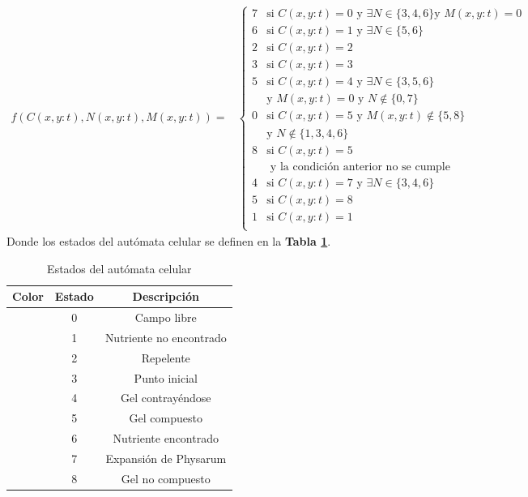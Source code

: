    \begin{equation*}
    \begin{aligned}
    f(C(x,y:t), N(x,y:t), M(x,y:t)) = & \begin{cases}
        7 & \text{si } C(x,y:t) = 0 \text{ y } \exists N \in \{3, 4, 6\} \text{y } M(x,y:t) = 0 \\
        6 & \text{si } C(x,y:t) = 1 \text{ y } \exists N \in \{5, 6\} \\
        2 & \text{si } C(x,y:t) = 2 \\
        3 & \text{si } C(x,y:t) = 3 \\
        5 & \text{si } C(x,y:t) = 4 \text{ y } \exists N \in \{3, 5, 6\} \\
        & \text{y } M(x,y:t) = 0 \text{ y } N \not\in \{0, 7\} \\
        0 & \text{si } C(x,y:t) = 5 \text{ y } M(x,y:t) \not\in \{5, 8\} \\
        & \text{y } N \not\in \{1, 3, 4, 6\} \\
        8 & \text{si } C(x,y:t) = 5 \\
        & \text{ y la condici\'on anterior no se cumple} \\
        4 & \text{si } C(x,y:t) = 7 \text{ y } \exists N \in \{3, 4, 6\} \\
        5 & \text{si } C(x,y:t) = 8 \\
        1 & \text{si } C(x,y:t) = 1 \\
    \end{cases}
    \end{aligned}
    \end{equation*}
    Donde los estados del aut\'omata celular se definen en la \textbf{Tabla \ref{tab:estados}}.
    \vskip 0.5cm
    \begin{table}[h]
        \begin{center}
            \begin{tabular}{|c|c|c|}
                \hline
                \textbf{Color}&\textbf{Estado}&\textbf{Descripci\'on} \\
                \hline
                \cellcolor{blue} & 0 & Campo libre  \\
                \cellcolor{royalblue} & 1 & Nutriente no encontrado \\
                \cellcolor{red} & 2 & Repelente \\
                \cellcolor{black} & 3 & Punto inicial \\
                \cellcolor{yellow} & 4 & Gel contray\'endose \\
                \cellcolor{darkgreen} & 5 & Gel compuesto \\
                \cellcolor{lemon} & 6 & Nutriente encontrado \\
                \cellcolor{darkgray} & 7 & Expansi\'on de Physarum \\
                \cellcolor{green} & 8 & Gel no compuesto \\
                \hline
            \end{tabular}
        \end{center}
        \caption{Estados del aut\'omata celular}
        \label{tab:estados}
    \end{table}
